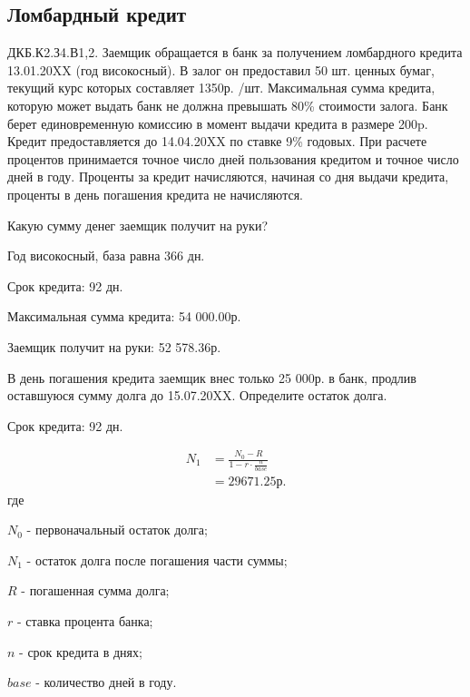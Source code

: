 \documentclass[12pt, table, a4paper,twoside]{exam}
\begin{document}
\begin{questions}
\begin{subparts}
\end{subparts}
\addpoints

\vfill\null\pagebreak
\subsection{Ломбардный кредит}
\question[15] ДКБ.К2.З4.В1,2. Заемщик обращается в банк за получением ломбардного кредита 13.01.20XX (год високосный). В залог он предоставил 50 шт. ценных бумаг, текущий курс которых составляет 1350р. /шт. Максимальная сумма кредита, которую может выдать банк не должна превышать 80\% стоимости залога. Банк берет единовременную комиссию в момент выдачи кредита в размере 200p. Кредит предоставляется до 14.04.20XX по ставке 9\% годовых. При расчете процентов принимается точное число дней пользования кредитом и точное число дней в году. Проценты за кредит начисляются, начиная со дня выдачи кредита, проценты в день погашения кредита не начисляются. 
\noaddpoints
\begin{subparts}
	\subpart[5]Какую сумму денег заемщик получит на руки?
	\begin{solution}[12em]
		Год високосный, база равна 366 дн. 
		
		Срок кредита: 92 дн.
		
		Максимальная сумма кредита: 54 000.00р.
				
		Заемщик получит на руки: 52 578.36р.
			
	\end{solution}
	
	\subpart[5] В день погашения кредита заемщик внес только 25 000р. в банк, продлив оставшуюся сумму долга до 15.07.20XX.  Определите остаток долга.
	\begin{solution}[12em]
		Срок кредита: 92 дн.
		
		\begin{align}
		N_1&=\frac{N_0-R}{1-r \cdot \frac{n}{base}}\\
		&=29 671.25\text{р.}\nonumber
		\end{align}
		где
		
		$N_0$ - первоначальный остаток долга; 
		
		$ N_1$ - остаток долга после погашения части суммы; 
		
		$ R$ - погашенная сумма долга; 
		
		$ r$ - ставка процента банка; 
		
		$ n$ - срок кредита в днях; 
		
		$ base$ - количество дней в году.
	\end{solution}


\end{subparts}
\end{questions}
\end{document}
